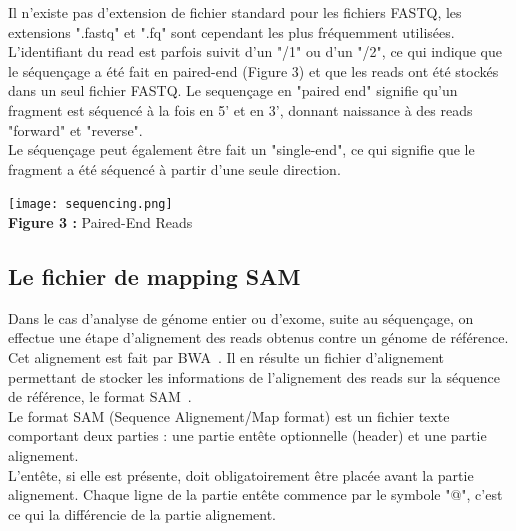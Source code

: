 \documentclass[a4paper,12pt]{article}
\begin{document}
Il n'existe pas d'extension de fichier standard pour les fichiers FASTQ, les extensions ".fastq" et ".fq" sont cependant les plus fréquemment utilisées. \\

L'identifiant du read est parfois suivit d'un "/1" ou d'un "/2", ce qui indique que le séquençage a été fait en paired-end (Figure 3) et que les reads ont été stockés dans un seul fichier FASTQ. Le sequençage en "paired end" signifie qu'un fragment est séquencé à la fois en 5' et en 3', donnant naissance à des reads "forward" et "reverse". \\
Le séquençage peut également être fait un "single-end", ce qui signifie que le fragment a été séquencé à partir d'une seule direction. 

\begin{center}
 \texttt{[image: sequencing.png]}~\\
\textbf{Figure 3 :} Paired-End Reads
\end{center}


\subsection{Le fichier de mapping SAM}

Dans le cas d'analyse de génome entier ou d'exome, suite au séquençage, on effectue une étape d'alignement des reads obtenus contre un génome de référence. Cet alignement est fait par BWA~\cite{BWA}. Il en résulte un fichier d'alignement permettant de stocker les informations de l'alignement des reads sur la séquence de référence, le format SAM~\cite{SAM}. \\

Le format SAM (Sequence Alignement/Map format) est un fichier texte comportant deux parties : une partie entête optionnelle (header) et une partie alignement.\\

L'entête, si elle est présente, doit obligatoirement être placée avant la partie alignement. Chaque ligne de la partie entête commence par le symbole "@", c'est ce qui la différencie de la partie alignement. \\
\end{document}
